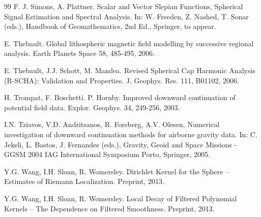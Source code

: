 \documentclass[a4paper, 10pt]{article}
\numberwithin{equation}{section}
\theoremstyle{definition}
\begin{document}
\begin{thebibliography}{99}
F. J. Simons, A. Plattner. Scalar and Vector Slepian Functions, Spherical Signal Estimation and Spectral Analysis. In: W. Freeden, Z. Nashed, T. Sonar (eds.), Handbook of Geomathematics, 2nd Ed., Springer, to appear.


E. Thebault. Global lithospheric magnetic field modelling by successive regional analysis. Earth Planets Space 58, 485-495, 2006.

E. Thebault, J.J. Schott, M. Mandea. Revised Spherical Cap Harmonic Analysis (R-SCHA): Validation and Properties. J. Geophys. Res. {111}, B01102, 2006.

H. Trompat, F. Boschetti. P. Hornby. Improved downward continuation of potential field data. Explor. Geophys. 34, 249-256, 2003.

I.N. Tziavos, V.D. Andritsanos, R. Forsberg, A.V. Olesen. Numerical investigation of downward continuation methods for airborne gravity data. In: C. Jekeli, L. Bastos, J. Fernandes (eds.), Gravity, Geoid and Space Missions - GGSM 2004 IAG International Symposium Porto, Springer, 2005.

Y.G. Wang, I.H. Sloan, R. Womersley. Dirichlet Kernel for the Sphere -- Estimates of Riemann Localization. Preprint, 2013.

Y.G. Wang, I.H. Sloan, R. Womersley. Local Decay of Filtered Polynomial Kernels -- The Dependence on Filtered Smoothness. Preprint, 2013.

\end{thebibliography}
\end{document}
